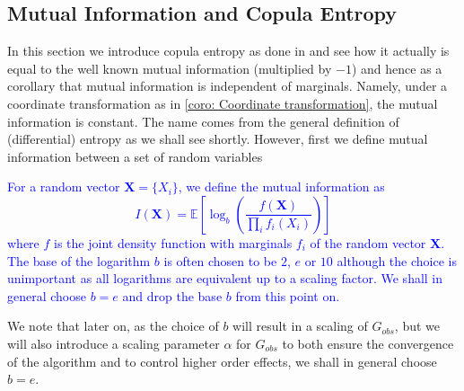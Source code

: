 \documentclass[../Thesis.tex]{subfiles}
\begin{document}
\subsection{Mutual Information and Copula Entropy}
In this section we introduce copula entropy as done in \cite{Nonparametric-copula-entropy-and-network-deconvolution-method-for-causal-discovery-in-complex-manufacturing-systems} and see how it actually is equal to the well known mutual information (multiplied by $-1$) and hence as a corollary that mutual information is independent of marginals. Namely, under a coordinate transformation as in \autoref{coro: Coordinate transformation}, the mutual information is constant. The name comes from the general definition of (differential) entropy as we shall see shortly. However, first we define mutual information between a set of random variables
\textcolor{blue}{
    \begin{definition}\label{def:mutual information}
        For a random vector $\boldsymbol{X} = \{X_i\}$, we define the mutual information as
        $$I(\boldsymbol{X}) = \mathbb{E}\left[\log_b \left(\frac{f(\boldsymbol X)}{\prod_i f_i (X_i)}\right)\right]$$
        where $f$ is the joint density function with marginals $f_i$ of the random vector $\boldsymbol{X}$.
        The base of the logarithm $b$ is often chosen to be $2$, $e$ or $10$ although the choice is unimportant as all logarithms are equivalent up to a scaling factor. We shall in general choose $b = e$ and drop the base $b$ from this point on.
    \end{definition}
}
We note that later on, as the choice of $b$ will result in a scaling of $G_{obs}$, but we will also introduce a scaling parameter $\alpha$ for $G_{obs}$ to both ensure the convergence of the algorithm and to control higher order effects, we shall in general choose $b = e$.
\end{document}
